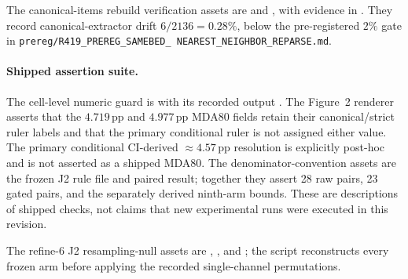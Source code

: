 \documentclass{article}
\newcommand{\pp}{\,\mathrm{pp}}
\begin{document}
The canonical-items rebuild verification assets are
 and
, with evidence in
.  They record canonical-extractor
drift $6/2136=0.28\%$, below the pre-registered $2\%$ gate in
\texttt{prereg/\allowbreak R419\_PREREG\_\allowbreak SAMEBED\_\allowbreak
NEAREST\_\allowbreak NEIGHBOR\_\allowbreak REPARSE.md}.

\paragraph{Shipped assertion suite.}
The cell-level numeric guard is  with its
recorded output .  The Figure~2
renderer asserts that the $4.719\pp$ and $4.977\pp$ MDA80 fields retain their
canonical/strict ruler labels and that the primary conditional ruler is not
assigned either value.  The primary conditional CI-derived
$\approx4.57\pp$ resolution is explicitly post-hoc and is not asserted as a
shipped MDA80.  The denominator-convention assets are the frozen J2
rule file and paired result; together they assert 28 raw pairs, 23 gated pairs,
and the separately derived ninth-arm bounds.  These are descriptions of shipped
checks, not claims that new experimental runs were executed in this revision.

{\raggedright
The refine-6 J2 resampling-null assets are
,
, and
; the script reconstructs every
frozen arm before applying the recorded single-channel permutations.\par}
\end{document}
